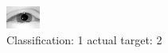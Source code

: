 \begin{figure}[h!]
\begin{center}
\includegraphics[width=0.60\columnwidth]{figures/ID2331_class_1_target_2.png}
\end{center}
\caption{ Classification: 1 actual target: 2}
\label{fig:ID2331_class_1_target_2}
\end{figure}
